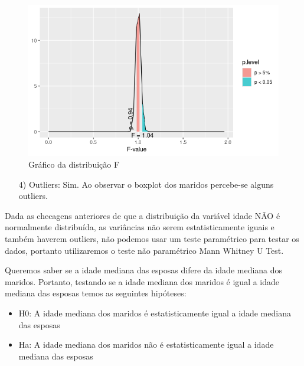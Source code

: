 \begin{figure}[H]
\centering
\includegraphics[width=.9\textwidth]{apendices/fig/4_IAA004_5.png} 
\caption{Gráfico da distribuição F}
\label{fig:subim1}
\end{figure}

\begin{enumerate}
    \item[4)] Outliers: Sim. Ao observar o boxplot dos maridos percebe-se alguns outliers.
\end{enumerate}

Dada as checagens anteriores de que a distribuição da variável idade NÃO é normalmente distribuída, as variâncias não serem estatisticamente iguais e também haverem outliers, não podemos usar um teste paramétrico para testar os dados, portanto utilizaremos o teste não paramétrico Mann Whitney U Test.

Queremos saber se a idade mediana das esposas difere da idade mediana dos maridos. Portanto, testando se a idade mediana dos maridos é igual a idade mediana das esposas temos as seguintes hipóteses:

\begin{itemize}
\item  H0: A idade mediana dos maridos é estatisticamente igual a idade mediana das esposas
\item  Ha: A idade mediana dos maridos não é estatisticamente igual a idade mediana das esposas\hfill \break
\end{itemize}

